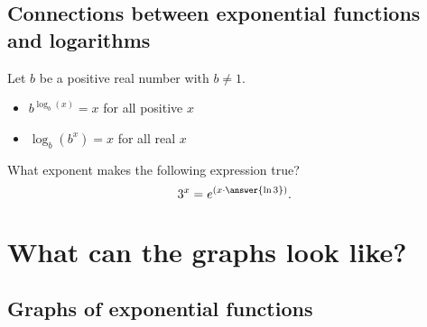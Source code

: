 \documentclass{ximera}
\begin{document}
\subsection{Connections between exponential functions and logarithms}

Let $b$ be a positive real number with $b\ne 1$.
\begin{itemize}
\item $b^{\log_b(x)} = x$ for all positive $x$
\item $\log_b(b^x) = x$ for all real $x$
\end{itemize}

\begin{question}
  What exponent makes the following expression true?
  \[
  3^x = e^{\left( x \cdot \answer{\ln 3} \right)}.
  \]
\end{question}


\section{What can the graphs look like?}

\subsection{Graphs of exponential functions}
\end{document}
